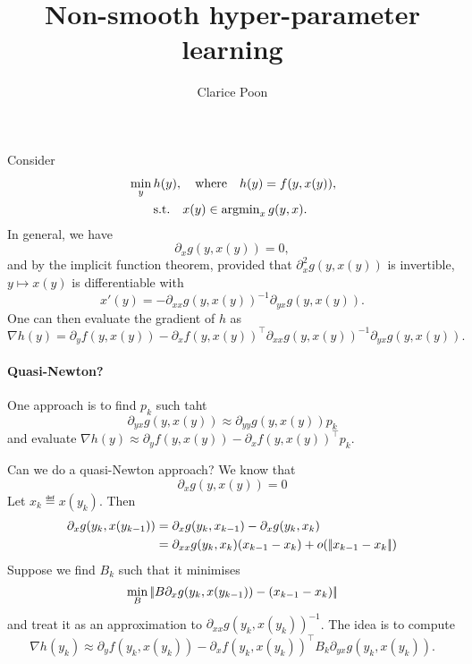 \documentclass{article}
\title{Non-smooth hyper-parameter learning }
\author{%
  Clarice Poon
}
\begin{document}
\maketitle


Consider
\begin{align*}
&\min_{y} h(y), \quad \text{where} \quad h(y) = f(y, x(y)),\\
 &\qquad \text{s.t.}  \quad x(y)\in \operatorname{argmin}_x g(y,x).
\end{align*}
In general, we have
$$
\partial_x g(y,x(y)) = 0,
$$
and by the implicit function theorem, provided that $\partial_{x}^2 g(y,x(y))$ is invertible, $y\mapsto x(y)$ is differentiable with
$$
x'(y) = - \partial_{xx}g(y,x(y))^{-1} \partial_{yx} g(y, x(y)).
$$
One can then evaluate the gradient of $h$ as
\begin{equation}\label{eq:gradient_bilev}
\nabla h(y) = \partial_y f(y, x(y)) - \partial_x f(y,x(y))^\top  \partial_{xx}g(y,x(y))^{-1} \partial_{yx} g(y, x(y)).
\end{equation}


\paragraph{Quasi-Newton?}
One approach is to  find $p_k$ such taht
$$
 \partial_{yx} g(y, x(y))\approx  \partial_{yy}g(y,x(y))  p_k
 $$
 and evaluate $\nabla h(y) \approx \partial_y f(y, x(y)) - \partial_x f(y,x(y))^\top p_k$.


Can we do a quasi-Newton approach?
We know that
$$
\partial_x g(y,x(y)) = 0
$$
Let $x_k\eqdef x(y_k)$. Then
\begin{align*}
\partial_x g(y_k,x(y_{k-1})) &=
\partial_x g(y_k,x_{k-1})- \partial_x g(y_k,x_k) \\
& = \partial_{xx} g(y_k, x_k) (x_{k-1} - x_{k}) + o(|\!| x_{k-1}-x_k |\!|)
\end{align*}
Suppose we find $B_{k}$ such that it minimises
$$
\min_B|\!|  B  \partial_x g(y_{k},x(y_{k-1})) - (x_{k-1} - x_{k})  |\!|
$$
and treat it as an approximation to $\partial_{xx} g(y_{k}, x(y_{k})) ^{-1}$. The idea is to compute
$$\nabla h(y_k) \approx \partial_y f(y_k, x(y_k)) - \partial_x f(y_k,x(y_k))^\top  B_{k} \partial_{yx} g(y_k, x(y_k)).
$$
\end{document}
